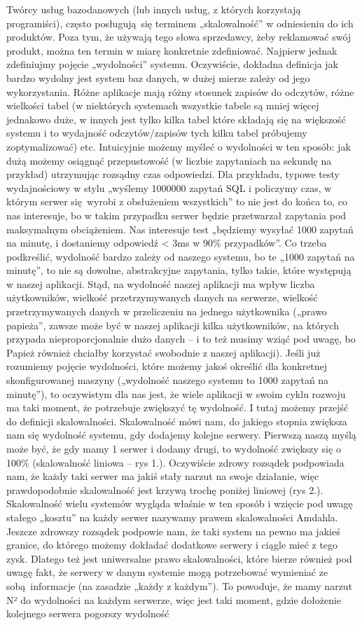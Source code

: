 \documentclass[a4paper,12pt]{article}
\begin{document}
Twórcy usług bazodanowych (lub innych usług, z których korzystają programiści), często posługują się terminem „skalowalność” w odniesieniu do ich produktów. Poza tym, że używają tego słowa sprzedawcy, żeby reklamować swój produkt, można ten termin w miarę konkretnie zdefiniować. Najpierw jednak zdefiniujmy pojęcie „wydolności” systemu. Oczywiście, dokładna definicja jak bardzo wydolny jest system baz danych, w dużej mierze zależy od jego wykorzystania.  Różne aplikacje mają różny stosunek zapisów do odczytów, różne wielkości tabel (w niektórych systemach wszystkie tabele są mniej więcej jednakowo duże, w innych jest tylko kilka tabel które składają się na większość systemu i to wydajność odczytów/zapisów tych kilku tabel próbujemy zoptymalizować) etc. Intuicyjnie możemy myśleć o wydolności w ten sposób: jak dużą możemy osiągnąć przepustowość (w liczbie zapytaniach na sekundę na przykład) utrzymując rozsądny czas odpowiedzi. Dla przykładu, typowe testy wydajnościowy w stylu „wyślemy 1000000 zapytań SQL i policzymy czas, w którym serwer się wyrobi z obsłużeniem wszystkich” to nie jest do końca to, co nas interesuje, bo w takim przypadku serwer będzie przetwarzał zapytania pod maksymalnym obciążeniem. Nas interesuje test „będziemy wysyłać 1000 zapytań na minutę, i dostaniemy odpowiedź < 3ms w 90\% przypadków”. Co trzeba podkreślić, wydolność bardzo zależy od naszego systemu, bo te „1000 zapytań na minutę”, to nie są dowolne, abstrakcyjne zapytania, tylko takie, które występują w naszej aplikacji. Stąd, na wydolność naszej aplikacji ma wpływ liczba użytkowników, wielkość przetrzymywanych danych na serwerze, wielkość przetrzymywanych danych w przeliczeniu na jednego użytkownika („prawo papieża”, zawsze może być w naszej aplikacji kilka użytkowników, na których przypada nieproporcjonalnie dużo danych – i to też musimy wziąć pod uwagę, bo Papież również chciałby korzystać swobodnie z naszej aplikacji). Jeśli już rozumiemy pojęcie wydolności, które możemy jakoś określić dla konkretnej skonfigurowanej maszyny („wydolność naszego systemu to 1000 zapytań na minutę”), to oczywistym dla nas jest, że wiele aplikacji w swoim cyklu rozwoju ma taki moment, że potrzebuje zwiększyć tę wydolność. I tutaj możemy przejść do definicji skalowalności. Skalowalność mówi nam, do jakiego stopnia zwiększa nam się wydolność systemu, gdy dodajemy kolejne serwery. Pierwszą naszą myślą może być, że gdy mamy 1 serwer i dodamy drugi, to wydolność zwiększy się o 100\% (skalowalność liniowa – rys 1.). Oczywiście zdrowy rozsądek podpowiada nam, że każdy taki serwer ma jakiś stały narzut na swoje działanie, więc prawdopodobnie skalowalność jest krzywą trochę poniżej liniowej (rys 2.). Skalowalność wielu systemów wygląda właśnie w ten sposób i wzięcie pod uwagę stałego „kosztu” na każdy serwer nazywamy prawem skalowalności Amdahla. Jeszcze zdrowszy rozsądek podpowie nam, że taki system na pewno ma jakieś granice, do którego możemy dokładać dodatkowe serwery i ciągle mieć z tego zysk. Dlatego też jest uniwersalne prawo skalowalności, które bierze również pod uwagę fakt, że serwery w danym systemie mogą potrzebować wymieniać ze sobą informacje (na zasadzie „każdy z każdym”). To powoduje, że mamy narzut N² do wydolności na każdym serwerze, więc jest taki moment, gdzie dołożenie kolejnego serwera pogorszy wydolność 
\end{document}
